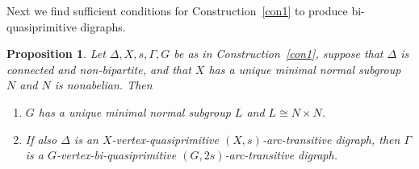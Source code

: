 \documentclass[11pt]{amsart}
\newtheorem{proposition}[theorem]{Proposition}
\begin{document}
{\color{blue}
}

Next we find sufficient conditions for Construction~\ref{con1} to produce bi-quasiprimitive digraphs.

\begin{proposition}\label{cor:biquasi}
    Let $\Delta, X, s, \Gamma, G$ be as in Construction~\ref{con1}, 
   suppose that \(\Delta\) is connected and non-bipartite, and that \(X\) has a unique minimal normal subgroup \(N\) and \(N\) is nonabelian. Then 
   \begin{enumerate}
       \item[(a)] $G$ has a unique minimal normal subgroup $L$ and \(L\cong N\times N\). 
       \item[(b)] If also  $\Delta$ is an $X$-vertex-quasiprimitive $(X,s)$-arc-transitive digraph, then \(\Gamma\) is a $G$-vertex-bi-quasiprimitive $(G,2s)$-arc-transitive digraph. 
   \end{enumerate} 
\end{proposition}
\end{document}

